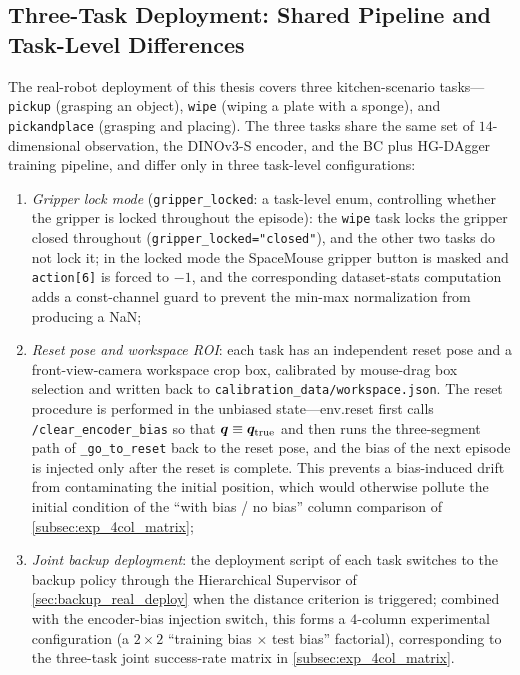 \subsection{Three-Task Deployment: Shared Pipeline and Task-Level Differences}\label{subsec:three_tasks}

The real-robot deployment of this thesis covers three kitchen-scenario tasks---\texttt{pickup} (grasping an object), \texttt{wipe} (wiping a plate with a sponge), and \texttt{pickandplace} (grasping and placing). The three tasks share the same set of $14$-dimensional observation, the DINOv3-S encoder, and the BC plus HG-DAgger training pipeline, and differ only in three task-level configurations:

\begin{enumerate}
  \item \emph{Gripper lock mode} (\texttt{gripper\_locked}: a task-level enum, controlling whether the gripper is locked throughout the episode): the \texttt{wipe} task locks the gripper closed throughout (\texttt{gripper\_locked="closed"}), and the other two tasks do not lock it; in the locked mode the SpaceMouse gripper button is masked and \texttt{action[6]} is forced to $-1$, and the corresponding dataset-stats computation adds a const-channel guard to prevent the min-max normalization from producing a NaN;
  \item \emph{Reset pose and workspace ROI}: each task has an independent reset pose and a front-view-camera workspace crop box, calibrated by mouse-drag box selection and written back to \texttt{calibration\_data/workspace.json}. The reset procedure is performed in the unbiased state---env.reset first calls \texttt{/clear\_encoder\_bias} so that $\bm{q} \equiv \bm{q}_\text{true}$ and then runs the three-segment path of \texttt{\_go\_to\_reset} back to the reset pose, and the bias of the next episode is injected only after the reset is complete. This prevents a bias-induced drift from contaminating the initial position, which would otherwise pollute the initial condition of the ``with bias / no bias'' column comparison of \cref{subsec:exp_4col_matrix};
  \item \emph{Joint backup deployment}: the deployment script of each task switches to the backup policy through the Hierarchical Supervisor of \cref{sec:backup_real_deploy} when the distance criterion is triggered; combined with the encoder-bias injection switch, this forms a $4$-column experimental configuration (a $2\times2$ ``training bias $\times$ test bias'' factorial), corresponding to the three-task joint success-rate matrix in \cref{subsec:exp_4col_matrix}.
\end{enumerate}

